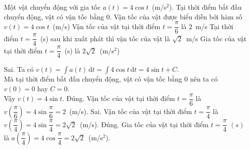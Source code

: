 \begin{ex}%
Một vật chuyển động với gia tốc $ a(t)=4\cos t$~(m/s$^2$). Tại thời điểm bắt đầu chuyển động, vật có vận tốc bằng $0$.
\choiceTF
{Vận tốc của vật được biểu diễn bởi hàm số $v(t)=4\cos t$~(m/s)}
{\True Vận tốc của vật tại thời điểm $ t=\dfrac{\pi}{6}$ là $2$~m/s}
{Tại thời điểm $ t=\dfrac{\pi}{4}$~(s) sau khi xuất phát thì vận tốc của vật là $\sqrt{2}$~m/s}
{\True Gia tốc của vật tại thời điểm $ t=\dfrac{\pi}{4}$~(s) là $2\sqrt{2}$~(m/s$^2$)}
\loigiai
{
	\begin{itemchoice}
	\itemch Sai. Ta có $ v(t)=\displaystyle\int a(t)\mathrm{\,d}t=\displaystyle\int 4\cos t\mathrm{\,d}t=4\sin t+C$.\\
	Mà tại thời điểm bắt đầu chuyển động, vật có vận tốc bằng $0$ nên ta có $v(0)=0$ hay $C=0$.\\
	Vậy $v(t)=4\sin t$.
	\itemch Đúng. Vận tốc của vật tại thời điểm $t=\dfrac{\pi}{6}$ là $ v\left(\dfrac{\pi}{6}\right)=4\sin \dfrac{\pi}{6}=2$~(m/s).
	\itemch Sai. Vận tốc của vật tại thời điểm $ t=\dfrac{\pi}{4}$ là $ v\left(\dfrac{\pi}{4}\right)=4\sin \dfrac{\pi}{4}=2\sqrt{2}$~(m/s).
	\itemch Đúng. Gia tốc của vật tại thời điểm $t=\dfrac{\pi}{4}$ $(s)$ là $ a\left(\dfrac{\pi}{4}\right)=4\cos \dfrac{\pi}{4}=2\sqrt{2}$~(m/s$^2$).
	\end{itemchoice}
}
\end{ex}

